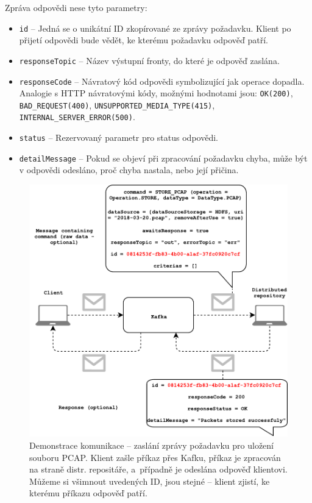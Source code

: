 \vspace{0.5cm}
\noindent Zpráva odpovědi nese tyto parametry:
\begin{itemize}
    \item \texttt{id} -- Jedná se o unikátní ID zkopírované ze zprávy požadavku. Klient po přijetí odpovědi bude vědět, ke kterému požadavku odpověď patří.
    
    \item \texttt{responseTopic} -- Název výstupní fronty, do které je odpověď zaslána.
    
    \item \texttt{responseCode} -- Návratový kód odpovědi symbolizující jak operace dopadla. Analogie s HTTP návratovými kódy, možnými hodnotami jsou: \texttt{OK(200)}, \texttt{BAD\_REQUEST(400)}, \texttt{UNSUPPORTED\_MEDIA\_TYPE(415)}, \texttt{INTERNAL\_SERVER\_ERROR(500)}.
    
    \item \texttt{status} -- Rezervovaný parametr pro status odpovědi.
    
    \item \texttt{detailMessage} -- Pokud se objeví při zpracování požadavku chyba, může být v odpovědi odesláno, proč chyba nastala, nebo její přičina.
\end{itemize}

\begin{figure}[!h]
  \centering
  \includegraphics[width=14cm]{template-fig/Kafka_communication.pdf}
  \caption{Demonstrace komunikace -- zaslání zprávy požadavku pro uložení souboru PCAP. Klient zašle příkaz přes Kafku, příkaz je zpracován na straně distr. repositáře, a~případně je odeslána odpověď klientovi. Můžeme si všimnout uvedených ID, jsou stejné -- klient zjistí, ke kterému příkazu odpověď patří.}
  \label{FIG_KafkaCommunication}
\end{figure}

